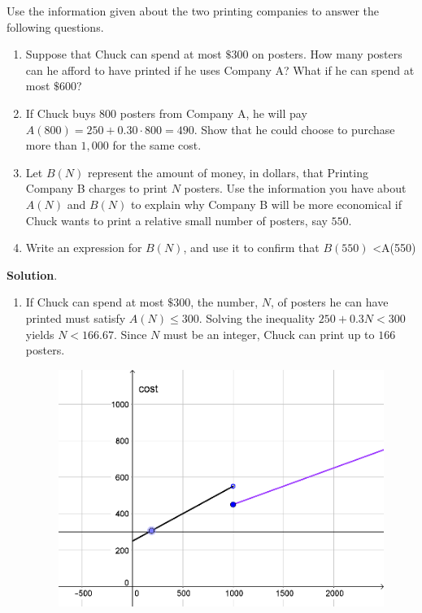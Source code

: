 \documentclass[10pt,]{book}
\theoremstyle{ptxdefinitionnotitle}
\theoremstyle{ptxdefinitiontitle}
\numberwithin{equation}{section}
\newcommand{\lt}{<}
\begin{document}
\begin{example}
\par
\hypertarget{p-10}{}%
Use the information given about the two printing companies to answer the following questions.%
\leavevmode%
\begin{enumerate}[label=\alph*)]
\item\hypertarget{li-1}{}Suppose that Chuck can spend at most \(\$300\) on posters. How many posters can he afford to have printed if he uses Company A? What if he can spend at most \(\$600\)?%
\item\hypertarget{li-2}{}If Chuck buys \(800\) posters from Company A, he will pay \(A(800) = 250 + 0.30 \cdot 800 = 490\). Show that he could choose to purchase more than \(1,000\) for the same cost.%
\item\hypertarget{li-3}{}Let \(B(N)\) represent the amount of money, in dollars, that Printing Company B charges to print \(N\) posters.  Use the information you have about \(A(N)\) and \(B(N)\) to explain why Company B will be more economical if Chuck wants to print a relative small number of posters, say \(550\).%
\item\hypertarget{li-4}{}Write an expression for \(B(N)\), and use it to confirm that \(B(550)\) \lt A(550)%
\end{enumerate}
\par\smallskip%
\noindent\textbf{Solution}.\hypertarget{solution-1}{}\quad%
\leavevmode%
\begin{enumerate}[label=\alph*)]
\item\hypertarget{li-5}{}\hypertarget{p-11}{}%
If Chuck can spend at most \(\$300\), the number, \(N\), of posters he can have printed must satisfy \(A(N) \leq 300\). Solving the inequality \(250 + 0.3N \lt 300\) yields \(N \lt 166.67\).  Since \(N\) must be an integer, Chuck can print up to \(166\) posters.%
\begin{figure}
\centering
\includegraphics[width=1\linewidth]{./src/images/chapter02/chapter02section01-example01-solutiona-graph.png}

\end{figure}
\end{enumerate}
\end{example}
\end{document}
